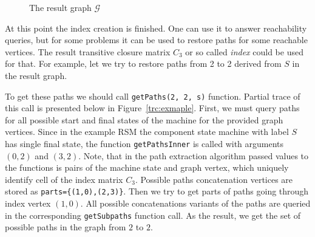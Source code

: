 \begin{figure}[h]
    \centering         
    \caption{The result graph $\mathcal{G}$}
    \label{fig:example_result}    
\end{figure}


At this point the index creation is finished. 
One can use it to answer reachability queries, but for some problems it can be used 
to restore paths for some reachable vertices. The result transitive closure matrix
$C_3$ or so called \textit{index} could be used for that. For example, let we try to
restore paths from 2 to 2 derived from $S$ in the result graph.

To get these paths we should call \verb|getPaths(2, 2, s)| function.
Partial trace of this call is presented below in Figure~\ref{trc:exmaple}. 
First, we must query paths for all possible start and final states of the 
machine for the provided graph vertices. Since in the example RSM the component 
state machine with label $S$ has single final state, the function 
\verb|getPathsInner| is called with arguments $(0,2)$ and $(3,2)$.
Note, that in the path extraction algorithm passed values to the functions is 
pairs of the machine state and graph vertex, which uniquely identify cell of 
the index matrix $C_3$. Possible paths concatenation vertices are stored as \verb|parts={(1,0),(2,3)}|. Then we try to get parts of paths going through 
index vertex $(1,0)$. All possible concatenations variants of the paths are 
queried in the corresponding \verb|getSubpaths| function call. As the result,
we get the set of possible paths in the graph from $2$ to $2$.

